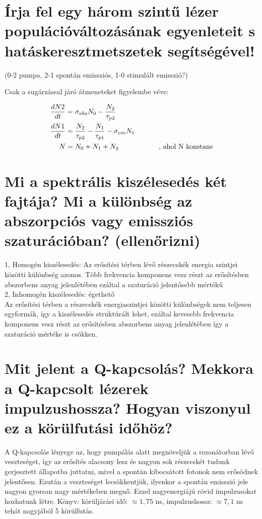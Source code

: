 \documentclass[12pt, a4paper]{article}
\begin{document}
\section{Írja fel egy három szintű lézer populációváltozásának egyenleteit s hatáskeresztmetszetek segítségével!}
(0-2 pumpa, 2-1 spontán emissziós, 1-0 stimulált emisszió?)

Csak a sugárzással járó átmeneteket figyelembe véve:
\begin{center}
\begin{align}
\frac{dN2}{dt} &= \sigma_{abs} N_0 - \frac{N_2}{\tau_{p2}}\\
\frac{dN1}{dt} &= \frac{N_2}{\tau_{p2}} - \frac{N_1}{\tau_{p1}} - \sigma_{em} N_1\\
N &= N_0 + N_1 + N_2 \text{\hspace{2 cm}, ahol N konstans}
\end{align}
\end{center}


\section{Mi a spektrális kiszélesedés két fajtája? Mi a különbség az abszorpciós vagy emissziós szaturációban? (ellenőrizni)}
1, Homogén kiszélesedés: Az erősítési térben lévő részecskék energia szintjei közötti különbség azonos. Több frekvencia komponens vesz részt az erősítésben abszorbens anyag jelenlétében ezáltal a szaturáció jelentősebb mértékű\\
2, Inhomogén kiszélesedés: égethető\\
Az erősítési térben a részecskék energiaszintjei közötti különbségek nem teljesen egyformák, így a kiszélesedés struktúrált lehet, ezáltal kevesebb frekvencia komponens vesz részt az erősítésben abszorbens anyag jelenlétében így a szaturáció mértéke is csökken.

\section{Mit jelent a Q-kapcsolás? Mekkora a Q-kapcsolt lézerek impulzushossza? Hogyan viszonyul ez a körülfutási időhöz?}
A Q-kapcsolás lényege az, hogy pumpálás alatt megnöveljük a rezonátorban lévő veszteséget, így az erősítés alacsony lesz és nagyon sok részecskét tudunk gerjesztett állapotba juttatni, mivel a spontán kibocsátott fotonok nem erősödnek jelentősen. Ezután a veszteséget lecsökkentjük, ilyenkor a spontán emisszió jele nagyon gyorsan nagy mértékeben megnő. Ezzel nagyenergiájú rövid impulzusokat hozhatunk létre. Könyv: körüljárási idő: $\approx 1,75$ ns, impulzushossz: $\approx 7,1$ ns tehát nagyjából 5 körülfutás.
\end{document}
